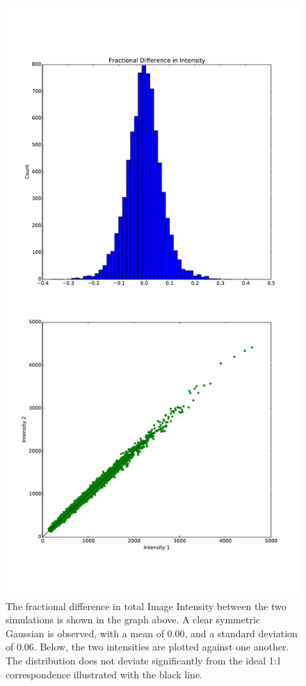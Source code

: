 \documentclass{article}
\begin{document}
\begin{figure}
\begin{center}
\includegraphics[height=0.9\textheight]{simtelerror1}
\caption{The fractional difference in total Image Intensity between the two simulations is shown in the graph above. A clear symmetric Gaussian is observed, with a mean of 0.00, and a standard deviation of 0.06. Below, the two intensities are plotted against one another. The distribution does not deviate significantly from the ideal 1:1 correspondence illustrated with the black line.}
\label{fig:simtelerror}
\end{center}
\end{figure} 
\end{document}
